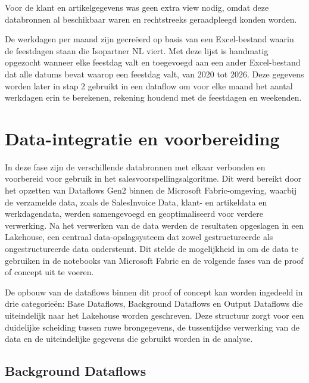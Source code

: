\vspace{1 em}

Voor de klant en artikelgegevens was geen extra view nodig, omdat deze databronnen al beschikbaar waren en rechtstreeks geraadpleegd konden worden.

\vspace{1 em}

De werkdagen per maand zijn gecreëerd op basis van een Excel-bestand waarin de feestdagen staan die Isopartner NL viert. Met deze lijst is handmatig opgezocht wanneer elke feestdag valt en toegevoegd aan een ander Excel-bestand dat alle datums bevat waarop een feestdag valt, van 2020 tot 2026. Deze gegevens worden later in stap 2 gebruikt in een dataflow om voor elke maand het aantal werkdagen erin te berekenen, rekening houdend met de feestdagen en weekenden.

\newpage	

\section{Data-integratie en voorbereiding}

In deze fase zijn de verschillende databronnen met elkaar verbonden en voorbereid voor gebruik in het salesvoorspellingsalgoritme. Dit werd bereikt door het opzetten van Dataflows Gen2 binnen de Microsoft Fabric-omgeving, waarbij de verzamelde data, zoals de SalesInvoice Data, klant- en artikeldata en werkdagendata, werden samengevoegd en geoptimaliseerd voor verdere verwerking. Na het verwerken van de data werden de resultaten opgeslagen in een Lakehouse, een centraal data-opslagsysteem dat zowel gestructureerde als ongestructureerde data ondersteunt. Dit stelde de mogelijkheid in om de data te gebruiken in de notebooks van Microsoft Fabric en de volgende fases van de proof of concept uit te voeren.



\vspace{1 em}

De opbouw van de dataflows binnen dit proof of concept kan worden ingedeeld in drie categorieën: Base Dataflows, Background Dataflows en Output Dataflows die uiteindelijk naar het Lakehouse worden geschreven. Deze structuur zorgt voor een duidelijke scheiding tussen ruwe brongegevens, de tussentijdse verwerking van de data en de uiteindelijke gegevens die gebruikt worden in de analyse.


\subsection{Background Dataflows}

